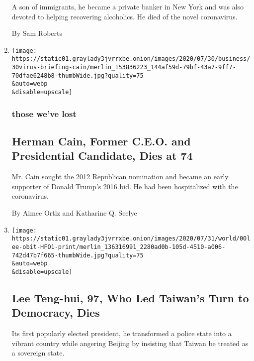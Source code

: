 \begin{enumerate}
  A son of immigrants, he became a private banker in New York and was
  also devoted to helping recovering alcoholics. He died of the novel
  coronavirus.

  By Sam Roberts
\item
  \href{/2020/07/30/us/politics/herman-cain-dead.html}{}

  \texttt{[image: https://static01.graylady3jvrrxbe.onion/images/2020/07/30/business/30virus-briefing-cain/merlin\_153836223\_144af59d-79bf-43a7-9ff7-70dfae6248b8-thumbWide.jpg?quality=75\\\&auto=webp\\\&disable=upscale]}

  \hypertarget{those-weve-lost-3}{%
  \subsubsection{those we've lost}\label{those-weve-lost-3}}

  \hypertarget{herman-cain-former-ceo-and-presidential-candidate-dies-at-74}{%
  \subsection{Herman Cain, Former C.E.O. and Presidential Candidate,
  Dies at
  74}\label{herman-cain-former-ceo-and-presidential-candidate-dies-at-74}}

  Mr. Cain sought the 2012 Republican nomination and became an early
  supporter of Donald Trump's 2016 bid. He had been hospitalized with
  the coronavirus.

  By Aimee Ortiz and Katharine Q. Seelye
\item
  \href{/2020/07/30/world/asia/lee-teng-hui-dead.html}{}

  \texttt{[image: https://static01.graylady3jvrrxbe.onion/images/2020/07/31/world/00lee-obit-HFO1-print/merlin\_136316991\_2280ad0b-105d-4510-a006-742d47b7f665-thumbWide.jpg?quality=75\\\&auto=webp\\\&disable=upscale]}

  \hypertarget{lee-teng-hui-97-who-led-taiwans-turn-to-democracy-dies}{%
  \subsection{Lee Teng-hui, 97, Who Led Taiwan's Turn to Democracy,
  Dies}\label{lee-teng-hui-97-who-led-taiwans-turn-to-democracy-dies}}

  Its first popularly elected president, he transformed a police state
  into a vibrant country while angering Beijing by insisting that Taiwan
  be treated as a sovereign state.


\end{enumerate}
